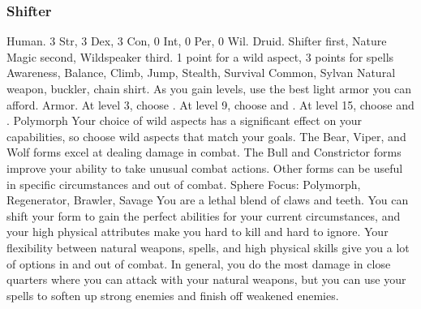         \subsubsection{Shifter}
             Human.
             3 Str, 3 Dex, 3 Con, 0 Int, 0 Per, 0 Wil.
             Druid.
             Shifter first, Nature Magic second, Wildspeaker third.
             1 point for a wild aspect, 3 points for spells
             Awareness, Balance, Climb, Jump, Stealth, Survival
             Common, Sylvan
             Natural weapon, buckler, chain shirt. As you gain levels, use the best light armor you can afford.
             Armor.
                At level 3, choose .
                At level 9, choose  and .
                At level 15, choose  and .
             Polymorph
             Your choice of wild aspects has a significant effect on your capabilities, so choose wild aspects that match your goals.
            The Bear, Viper, and Wolf forms excel at dealing damage in combat.
            The Bull and Constrictor forms improve your ability to take unusual combat actions.
            Other forms can be useful in specific circumstances and out of combat.
             Sphere Focus: Polymorph, Regenerator, Brawler, Savage
             You are a lethal blend of claws and teeth.
            You can shift your form to gain the perfect abilities for your current circumstances, and your high physical attributes make you hard to kill and hard to ignore.
            Your flexibility between natural weapons, spells, and high physical skills give you a lot of options in and out of combat.
            In general, you do the most damage in close quarters where you can attack with your natural weapons, but you can use your spells to soften up strong enemies and finish off weakened enemies.

